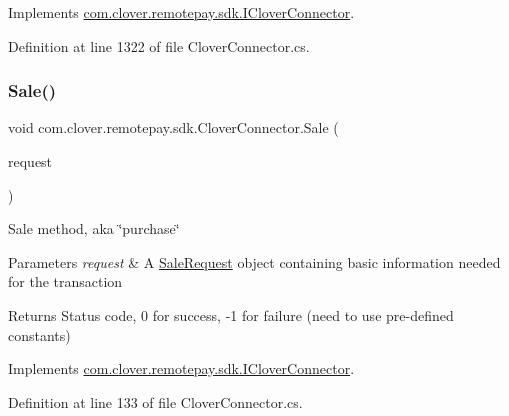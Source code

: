 Implements \hyperlink{interfacecom_1_1clover_1_1remotepay_1_1sdk_1_1_i_clover_connector_a36a6d360ab810558e7a78e9d09bffc5e}{com.\+clover.\+remotepay.\+sdk.\+I\+Clover\+Connector}.



Definition at line 1322 of file Clover\+Connector.\+cs.

\mbox{\label{classcom_1_1clover_1_1remotepay_1_1sdk_1_1_clover_connector_a1adbcc8a0d4aaa82157a102af4f16b91}} 
\subsubsection{\texorpdfstring{Sale()}{Sale()}}
{\footnotesize\ttfamily void com.\+clover.\+remotepay.\+sdk.\+Clover\+Connector.\+Sale (\begin{DoxyParamCaption}\item[{\hyperlink{classcom_1_1clover_1_1remotepay_1_1sdk_1_1_sale_request}{Sale\+Request}}]{request }\end{DoxyParamCaption})}



Sale method, aka \char`\"{}purchase\char`\"{} 


\begin{DoxyParams}{Parameters}
{\em request} & A \hyperlink{classcom_1_1clover_1_1remotepay_1_1sdk_1_1_sale_request}{Sale\+Request} object containing basic information needed for the transaction\\
\hline
\end{DoxyParams}
\begin{DoxyReturn}{Returns}
Status code, 0 for success, -\/1 for failure (need to use pre-\/defined constants)
\end{DoxyReturn}


Implements \hyperlink{interfacecom_1_1clover_1_1remotepay_1_1sdk_1_1_i_clover_connector_acc92394e6902137c559510e498e78529}{com.\+clover.\+remotepay.\+sdk.\+I\+Clover\+Connector}.



Definition at line 133 of file Clover\+Connector.\+cs.

\mbox{\label{classcom_1_1clover_1_1remotepay_1_1sdk_1_1_clover_connector_a328a0dd8b4ed02567f7e8d3184f35038}} 
